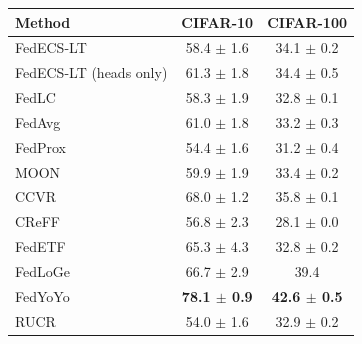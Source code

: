 \begin{tabular}{lcc}
\toprule
Method & CIFAR-10 & CIFAR-100\\
\midrule
FedECS-LT & 58.4 $\pm$ 1.6 & 34.1 $\pm$ 0.2\\
FedECS-LT (heads only) & 61.3 $\pm$ 1.8 & 34.4 $\pm$ 0.5\\
FedLC & 58.3 $\pm$ 1.9 & 32.8 $\pm$ 0.1\\
FedAvg & 61.0 $\pm$ 1.8 & 33.2 $\pm$ 0.3\\
FedProx & 54.4 $\pm$ 1.6 & 31.2 $\pm$ 0.4\\
MOON & 59.9 $\pm$ 1.9 & 33.4 $\pm$ 0.2\\
CCVR & 68.0 $\pm$ 1.2 & 35.8 $\pm$ 0.1\\
CReFF & 56.8 $\pm$ 2.3 & 28.1 $\pm$ 0.0\\
FedETF & 65.3 $\pm$ 4.3 & 32.8 $\pm$ 0.2\\
FedLoGe & 66.7 $\pm$ 2.9 & 39.4\\
FedYoYo & \textbf{78.1 $\pm$ 0.9} & \textbf{42.6 $\pm$ 0.5}\\
RUCR & 54.0 $\pm$ 1.6 & 32.9 $\pm$ 0.2\\
\bottomrule
\end{tabular}
